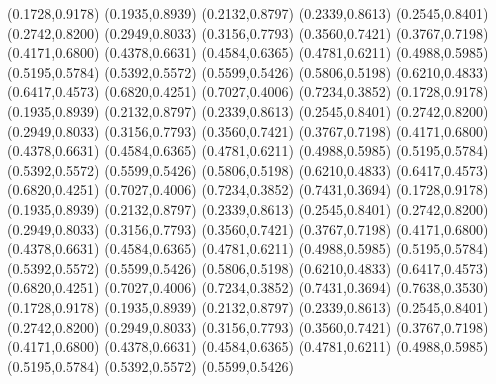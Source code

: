 \PST@Diamond(0.1728,0.9178)
\PST@Diamond(0.1935,0.8939)
\PST@Diamond(0.2132,0.8797)
\PST@Diamond(0.2339,0.8613)
\PST@Diamond(0.2545,0.8401)
\PST@Diamond(0.2742,0.8200)
\PST@Diamond(0.2949,0.8033)
\PST@Diamond(0.3156,0.7793)
\PST@Diamond(0.3560,0.7421)
\PST@Diamond(0.3767,0.7198)
\PST@Diamond(0.4171,0.6800)
\PST@Diamond(0.4378,0.6631)
\PST@Diamond(0.4584,0.6365)
\PST@Diamond(0.4781,0.6211)
\PST@Diamond(0.4988,0.5985)
\PST@Diamond(0.5195,0.5784)
\PST@Diamond(0.5392,0.5572)
\PST@Diamond(0.5599,0.5426)
\PST@Diamond(0.5806,0.5198)
\PST@Diamond(0.6210,0.4833)
\PST@Diamond(0.6417,0.4573)
\PST@Diamond(0.6820,0.4251)
\PST@Diamond(0.7027,0.4006)
\PST@Diamond(0.7234,0.3852)
\PST@Diamond(0.1728,0.9178)
\PST@Diamond(0.1935,0.8939)
\PST@Diamond(0.2132,0.8797)
\PST@Diamond(0.2339,0.8613)
\PST@Diamond(0.2545,0.8401)
\PST@Diamond(0.2742,0.8200)
\PST@Diamond(0.2949,0.8033)
\PST@Diamond(0.3156,0.7793)
\PST@Diamond(0.3560,0.7421)
\PST@Diamond(0.3767,0.7198)
\PST@Diamond(0.4171,0.6800)
\PST@Diamond(0.4378,0.6631)
\PST@Diamond(0.4584,0.6365)
\PST@Diamond(0.4781,0.6211)
\PST@Diamond(0.4988,0.5985)
\PST@Diamond(0.5195,0.5784)
\PST@Diamond(0.5392,0.5572)
\PST@Diamond(0.5599,0.5426)
\PST@Diamond(0.5806,0.5198)
\PST@Diamond(0.6210,0.4833)
\PST@Diamond(0.6417,0.4573)
\PST@Diamond(0.6820,0.4251)
\PST@Diamond(0.7027,0.4006)
\PST@Diamond(0.7234,0.3852)
\PST@Diamond(0.7431,0.3694)
\PST@Diamond(0.1728,0.9178)
\PST@Diamond(0.1935,0.8939)
\PST@Diamond(0.2132,0.8797)
\PST@Diamond(0.2339,0.8613)
\PST@Diamond(0.2545,0.8401)
\PST@Diamond(0.2742,0.8200)
\PST@Diamond(0.2949,0.8033)
\PST@Diamond(0.3156,0.7793)
\PST@Diamond(0.3560,0.7421)
\PST@Diamond(0.3767,0.7198)
\PST@Diamond(0.4171,0.6800)
\PST@Diamond(0.4378,0.6631)
\PST@Diamond(0.4584,0.6365)
\PST@Diamond(0.4781,0.6211)
\PST@Diamond(0.4988,0.5985)
\PST@Diamond(0.5195,0.5784)
\PST@Diamond(0.5392,0.5572)
\PST@Diamond(0.5599,0.5426)
\PST@Diamond(0.5806,0.5198)
\PST@Diamond(0.6210,0.4833)
\PST@Diamond(0.6417,0.4573)
\PST@Diamond(0.6820,0.4251)
\PST@Diamond(0.7027,0.4006)
\PST@Diamond(0.7234,0.3852)
\PST@Diamond(0.7431,0.3694)
\PST@Diamond(0.7638,0.3530)
\PST@Diamond(0.1728,0.9178)
\PST@Diamond(0.1935,0.8939)
\PST@Diamond(0.2132,0.8797)
\PST@Diamond(0.2339,0.8613)
\PST@Diamond(0.2545,0.8401)
\PST@Diamond(0.2742,0.8200)
\PST@Diamond(0.2949,0.8033)
\PST@Diamond(0.3156,0.7793)
\PST@Diamond(0.3560,0.7421)
\PST@Diamond(0.3767,0.7198)
\PST@Diamond(0.4171,0.6800)
\PST@Diamond(0.4378,0.6631)
\PST@Diamond(0.4584,0.6365)
\PST@Diamond(0.4781,0.6211)
\PST@Diamond(0.4988,0.5985)
\PST@Diamond(0.5195,0.5784)
\PST@Diamond(0.5392,0.5572)
\PST@Diamond(0.5599,0.5426)
